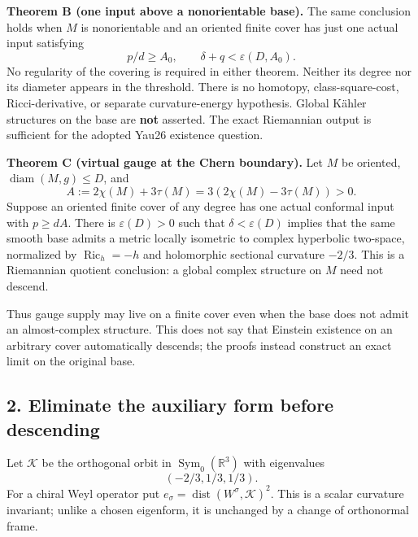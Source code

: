 \documentclass[
  11pt,
]{article}
\begin{document}
\textbf{Theorem B (one input above a nonorientable base).} The same
conclusion holds when \(M\) is nonorientable and an oriented finite
cover has just one actual input satisfying \[
                    p/d\ge A_0,\qquad \delta+q<\varepsilon(D,A_0).
 \tag{4}
\] No regularity of the covering is required in either theorem. Neither
its degree nor its diameter appears in the threshold. There is no
homotopy, class-square-cost, Ricci-derivative, or separate
curvature-energy hypothesis. Global Kähler structures on the base are
\textbf{not} asserted. The exact Riemannian output is sufficient for the
adopted Yau26 existence question.

\textbf{Theorem C (virtual gauge at the Chern boundary).} Let \(M\) be
oriented, \(\operatorname{diam}(M,g)\le D\), and \[
       A:=2\chi(M)+3\tau(M)=3(2\chi(M)-3\tau(M))>0.
 \tag{5}
\] Suppose an oriented finite cover of any degree has one actual
conformal input with \(p\ge dA\). There is \(\varepsilon(D)>0\) such
that \(\delta<\varepsilon(D)\) implies that the same smooth base admits
a metric locally isometric to complex hyperbolic two-space, normalized
by \(\operatorname{Ric}_h=-h\) and holomorphic sectional curvature
\(-2/3\). This is a Riemannian quotient conclusion: a global complex
structure on \(M\) need not descend.

Thus gauge supply may live on a finite cover even when the base does not
admit an almost-complex structure. This does not say that Einstein
existence on an arbitrary cover automatically descends; the proofs
instead construct an exact limit on the original base.

\hypertarget{eliminate-the-auxiliary-form-before-descending}{%
\subsection{2. Eliminate the auxiliary form before
descending}\label{eliminate-the-auxiliary-form-before-descending}}

Let \(\mathcal K\) be the orthogonal orbit in
\(\operatorname{Sym}_0(\mathbb R^3)\) with eigenvalues \[
                          (-2/3,1/3,1/3).
 \tag{6}
\] For a chiral Weyl operator put
\(e_\sigma=\operatorname{dist}(W^\sigma, \mathcal K)^2\). This is a
scalar curvature invariant; unlike a chosen eigenform, it is unchanged
by a change of orthonormal frame.
\end{document}
